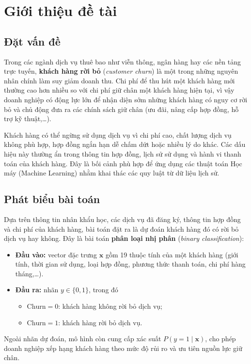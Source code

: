 \section{Giới thiệu đề tài}

\subsection{Đặt vấn đề}
Trong các ngành dịch vụ thuê bao như viễn thông, ngân hàng hay các nền tảng trực tuyến, \textbf{khách hàng rời bỏ} (\textit{customer churn}) là một trong những nguyên nhân chính làm suy giảm doanh thu. Chi phí để thu hút một khách hàng mới thường cao hơn nhiều so với chi phí giữ chân một khách hàng hiện tại, vì vậy doanh nghiệp có động lực lớn để nhận diện sớm những khách hàng có nguy cơ rời bỏ và chủ động đưa ra các chính sách giữ chân (ưu đãi, nâng cấp hợp đồng, hỗ trợ kỹ thuật,\ldots).

Khách hàng có thể ngừng sử dụng dịch vụ vì chi phí cao, chất lượng dịch vụ không phù hợp, hợp đồng ngắn hạn dễ chấm dứt hoặc nhiều lý do khác. Các dấu hiệu này thường ẩn trong thông tin hợp đồng, lịch sử sử dụng và hành vi thanh toán của khách hàng. Đây là bối cảnh phù hợp để ứng dụng các thuật toán Học máy (Machine Learning) nhằm khai thác các quy luật từ dữ liệu lịch sử.

\subsection{Phát biểu bài toán}
Dựa trên thông tin nhân khẩu học, các dịch vụ đã đăng ký, thông tin hợp đồng và chi phí của khách hàng, bài toán đặt ra là dự đoán khách hàng đó có rời bỏ dịch vụ hay không. Đây là bài toán \textbf{phân loại nhị phân} (\textit{binary classification}):
\begin{itemize}
    \item \textbf{Đầu vào:} vector đặc trưng $\mathbf{x}$ gồm 19 thuộc tính của một khách hàng (giới tính, thời gian sử dụng, loại hợp đồng, phương thức thanh toán, chi phí hàng tháng,\ldots).
    \item \textbf{Đầu ra:} nhãn $y \in \{0, 1\}$, trong đó
    \begin{itemize}
        \item $\text{Churn} = 0$: khách hàng không rời bỏ dịch vụ;
        \item $\text{Churn} = 1$: khách hàng rời bỏ dịch vụ.
    \end{itemize}
\end{itemize}
Ngoài nhãn dự đoán, mô hình còn cung cấp xác suất $P(y=1 \mid \mathbf{x})$, cho phép doanh nghiệp xếp hạng khách hàng theo mức độ rủi ro và ưu tiên nguồn lực giữ chân.

